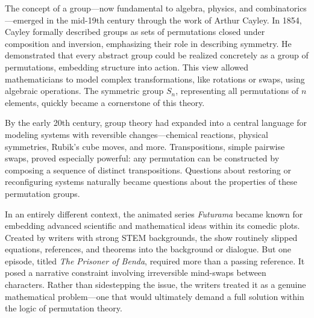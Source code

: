 \begin{historical}
The concept of a group—now fundamental to algebra, physics, and combinatorics—emerged in the mid-19th century through the work of Arthur Cayley. In 1854, Cayley formally described groups as sets of permutations closed under composition and inversion, emphasizing their role in describing symmetry. He demonstrated that every abstract group could be realized concretely as a group of permutations, embedding structure into action. This view allowed mathematicians to model complex transformations, like rotations or swaps, using algebraic operations. The symmetric group \( S_n \), representing all permutations of \( n \) elements, quickly became a cornerstone of this theory.

By the early 20th century, group theory had expanded into a central language for modeling systems with reversible changes—chemical reactions, physical symmetries, Rubik’s cube moves, and more. Transpositions, simple pairwise swaps, proved especially powerful: any permutation can be constructed by composing a sequence of distinct transpositions. Questions about restoring or reconfiguring systems naturally became questions about the properties of these permutation groups.

In an entirely different context, the animated series \textit{Futurama} became known for embedding advanced scientific and mathematical ideas within its comedic plots. Created by writers with strong STEM backgrounds, the show routinely slipped equations, references, and theorems into the background or dialogue. But one episode, titled \textit{The Prisoner of Benda}, required more than a passing reference. It posed a narrative constraint involving irreversible mind-swaps between characters. Rather than sidestepping the issue, the writers treated it as a genuine mathematical problem—one that would ultimately demand a full solution within the logic of permutation theory.
\end{historical}
